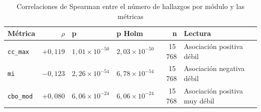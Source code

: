 \begin{table}[t]
\centering
\footnotesize
\setlength{\tabcolsep}{5pt}
\caption{Correlaciones de Spearman entre el número de hallazgos por módulo y las métricas}
\label{tab:spearman}
\begin{tabularx}{\textwidth}{@{}l r l l r >{\raggedright\arraybackslash}X@{}}
\toprule
\textbf{Métrica} & \textbf{$\rho$} & \textbf{p} & \textbf{p Holm} & \textbf{n} & \textbf{Lectura} \\
\midrule
\texttt{cc\_max} & $+0{,}119$ & $1{,}01 \times 10^{-50}$ & $2{,}03 \times 10^{-50}$ & 15\,768 & Asociación positiva débil \\
\texttt{mi} & $-0{,}123$ & $2{,}26 \times 10^{-54}$ & $6{,}78 \times 10^{-54}$ & 15\,768 & Asociación negativa débil \\
\texttt{cbo\_mod} & $+0{,}080$ & $6{,}06 \times 10^{-24}$ & $6{,}06 \times 10^{-24}$ & 15\,768 & Asociación positiva muy débil \\
\bottomrule
\end{tabularx}
\end{table}